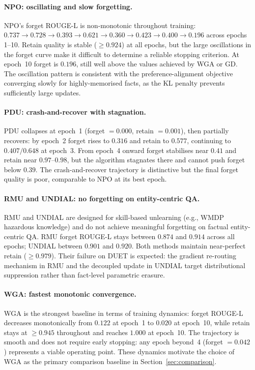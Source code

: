 \paragraph{NPO: oscillating and slow forgetting.}
NPO's forget ROUGE-L is non-monotonic throughout training: $0.737 \to 0.728 \to 0.393 \to 0.621 \to 0.360 \to 0.423 \to 0.400 \to 0.196$ across epochs 1--10. Retain quality is stable ($\geq 0.924$) at all epochs, but the large oscillations in the forget curve make it difficult to determine a reliable stopping criterion. At epoch~10 forget is $0.196$, still well above the values achieved by WGA or GD. The oscillation pattern is consistent with the preference-alignment objective converging slowly for highly-memorised facts, as the KL penalty prevents sufficiently large updates.

\paragraph{PDU: crash-and-recover with stagnation.}
PDU collapses at epoch~1 (forget $= 0.000$, retain $= 0.001$), then partially recovers: by epoch~2 forget rises to $0.316$ and retain to $0.577$, continuing to $0.407/0.648$ at epoch~3. From epoch~4 onward forget stabilises near $0.41$ and retain near $0.97$--$0.98$, but the algorithm stagnates there and cannot push forget below $0.39$. The crash-and-recover trajectory is distinctive but the final forget quality is poor, comparable to NPO at its best epoch.

\paragraph{RMU and UNDIAL: no forgetting on entity-centric QA.}
RMU and UNDIAL are designed for skill-based unlearning (e.g., WMDP hazardous knowledge) and do not achieve meaningful forgetting on factual entity-centric QA. RMU forget ROUGE-L stays between $0.874$ and $0.914$ across all epochs; UNDIAL between $0.901$ and $0.920$. Both methods maintain near-perfect retain ($\geq 0.979$). Their failure on DUET is expected: the gradient re-routing mechanism in RMU and the decoupled update in UNDIAL target distributional suppression rather than fact-level parametric erasure.

\paragraph{WGA: fastest monotonic convergence.}
WGA is the strongest baseline in terms of training dynamics: forget ROUGE-L decreases monotonically from $0.122$ at epoch~1 to $0.020$ at epoch~10, while retain stays at $\geq 0.945$ throughout and reaches $1.000$ at epoch~10. The trajectory is smooth and does not require early stopping: any epoch beyond~4 (forget $= 0.042$) represents a viable operating point. These dynamics motivate the choice of WGA as the primary comparison baseline in Section~\ref{sec:comparison}.


